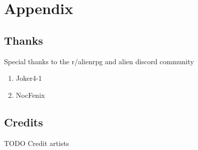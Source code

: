 \chapter{Appendix}

  


\section{Thanks}

\begin{rpg-commentbox}{Special thanks to the r/alienrpg and alien discord community}
    
    \begin{enumerate}
        \item Joker4-1
        \item NocFenix
    \end{enumerate}
\end{rpg-commentbox} 

\section{Credits}

\begin{rpg-warnbox}{TODO}
    Credit artists
\end{rpg-warnbox}

\clearpage

